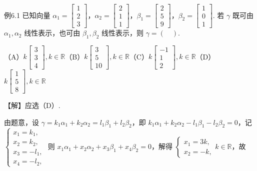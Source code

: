 \begin{fcard}{例6.1}
已知向量 $\alpha_1=\begin{bmatrix}1\\2\\3\end{bmatrix}$，$\alpha_2=\begin{bmatrix}2\\1\\1\end{bmatrix}$，$\beta_1=\begin{bmatrix}2\\5\\9\end{bmatrix}$，$\beta_2=\begin{bmatrix}1\\0\\1\end{bmatrix}$. 若 $\gamma$ 既可由 $\alpha_1,\alpha_2$ 线性表示，也可由 $\beta_1,\beta_2$ 线性表示，则 $\gamma=(\quad)$.

（A）$k\begin{bmatrix}3\\3\\4\end{bmatrix},k\in\mathbb{R}$\qquad（B）$k\begin{bmatrix}3\\5\\10\end{bmatrix},k\in\mathbb{R}$\qquad（C）$k\begin{bmatrix}-1\\1\\2\end{bmatrix},k\in\mathbb{R}$\qquad（D）$k\begin{bmatrix}1\\5\\8\end{bmatrix},k\in\mathbb{R}$

【解】应选（D）.


由题意，设 $\gamma=k_1\alpha_1+k_2\alpha_2=l_1\beta_1+l_2\beta_2$，即 $k_1\alpha_1+k_2\alpha_2-l_1\beta_1-l_2\beta_2=0$，记 $\begin{cases}x_1=k_1,\\x_2=k_2,\\x_3=-l_1,\\x_4=-l_2,\end{cases}$ 则 $x_1\alpha_1+x_2\alpha_2+x_3\beta_1+x_4\beta_2=0$，解得 $\begin{cases}x_1=3k,\\x_2=-k,\end{cases}k\in\mathbb{R}$，故


\end{fcard}
